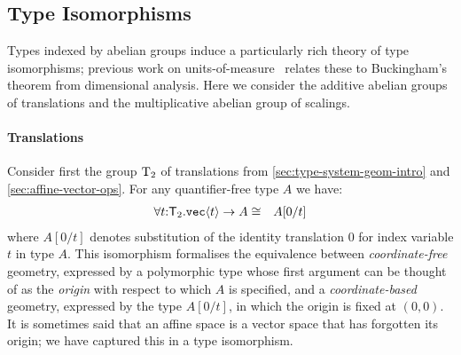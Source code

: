 \subsection{Type Isomorphisms}
\label{sec:types-indexed-abelian-groups}
Types indexed by abelian groups induce a particularly rich theory of
type isomorphisms; previous work on
units-of-measure~\cite{kennedy97relational} relates these to
Buckingham's theorem from dimensional analysis. Here we consider the
additive abelian groups of translations and the multiplicative abelian
group of scalings.

\paragraph{Translations} 
Consider first the group $\mathrm{T}_2$ of translations from
\autoref{sec:type-system-geom-intro} and 
\autoref{sec:affine-vector-ops}. For any quantifier-free type $A$
we have: %
\begin{eqnarray*}
\forall t\mathord:\mathsf{T}_2.\textup{\texttt{vec}}\langle t \rangle\to A
& \cong &
A[0/t]
\end{eqnarray*}
where $A[0/t]$ denotes substitution of the identity translation $0$
for index variable $t$ in type $A$. This isomorphism formalises the
equivalence between \emph{coordinate-free} geometry, expressed by a
polymorphic type whose first argument can be thought of as the
\emph{origin} with respect to which $A$ is specified, and a
\emph{coordinate-based} geometry, expressed by the type $A[0/t]$, in
which the origin is fixed at $(0,0)$. It is sometimes said that an
affine space is a vector space that has forgotten its origin; we have
captured this in a type isomorphism.

